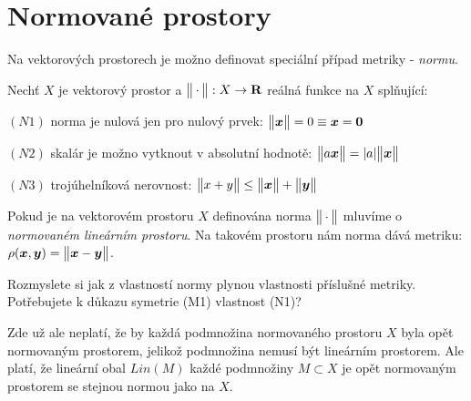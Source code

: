 \section{Normované prostory}
   Na vektorových prostorech je možno definovat speciální případ metriky - {\it normu}.
   \begin{definition}
      Nechť $X$ je vektorový prostor a $\bigl\Vert{\hspace{0.18em}\cdot\hspace{0.18em}}\bigr\Vert: X\rightarrow {\rm\bf R}$ reálná funkce na $X$ splňující:
      \begin{description}
        \item $(N1)$ norma je nulová jen pro nulový prvek: $\bigl\Vert\mathbf{\boldsymbol{x}}\bigr\Vert=0 \equiv \mathbf{\boldsymbol{x}}=\mathbf{\boldsymbol{0}}$
        \item $(N2)$ skalár je možno vytknout v absolutní hodnotě: $\bigl\Vert a \mathbf{\boldsymbol{x}}\bigr\Vert = \lvert a\rvert\bigl\Vert\mathbf{\boldsymbol{x}}\bigr\Vert$
        \item $(N3)$ trojúhelníková nerovnost: $\bigl\Vert x+y\bigr\Vert\le \bigl\Vert\mathbf{\boldsymbol{x}}\bigr\Vert + \bigl\Vert\mathbf{\boldsymbol{y}}\bigr\Vert$
      \end{description}
   \end{definition}
   Pokud je na vektorovém prostoru $X$ definována norma $\bigl\Vert{\hspace{0.18em}\cdot\hspace{0.18em}}\bigr\Vert$ mluvíme o {\it normovaném lineárním prostoru}. Na takovém prostoru
   nám norma dává metriku: $\rho(\mathbf{\boldsymbol{x}},\mathbf{\boldsymbol{y}}) = \bigl\Vert\mathbf{\boldsymbol{x}}-\mathbf{\boldsymbol{y}}\bigr\Vert$.
   \begin{exercise}
      Rozmyslete si jak z vlastností normy plynou vlastnosti příslušné metriky. Potřebujete k důkazu symetrie (M1) vlastnost (N1)?
   \end{exercise}
  
   Zde už ale neplatí, že by každá  podmnožina normovaného prostoru $X$ byla opět normovaným prostorem, jelikož podmnožina nemusí být lineárním
   prostorem. Ale platí, že lineární obal $Lin(M)$ každé podmnožiny $M\subset X$ je opět normovaným prostorem se stejnou normou jako na $X$. 
   
